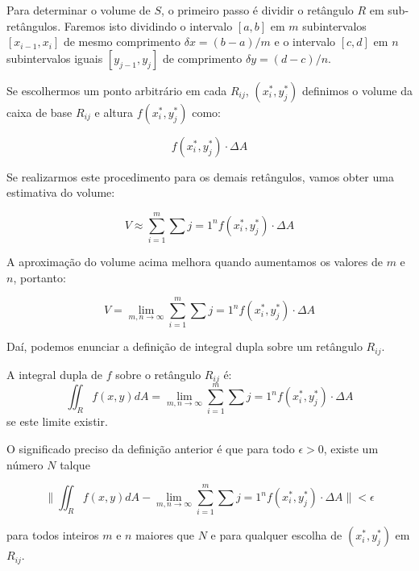 Para determinar o volume de $S$, o primeiro passo é dividir o retângulo $R$ em sub-retângulos. Faremos isto dividindo o intervalo $[a,b]$ em $m$ subintervalos $[x_{i-1}, x_{i}]$ de mesmo comprimento $\delta x = (b-a)/m$ e o intervalo $[c,d]$ em $n$ subintervalos iguais $[y_{j-1}, y_{j}]$ de comprimento $\delta y = (d-c)/n$.

\begin{figure}[!h]
 \centering
 
\end{figure}

Se escolhermos um ponto arbitrário em cada $R_{ij}$, $(x_i^*, y_j^*)$ definimos o volume da caixa de base $R_{ij}$ e altura $f(x_i^*, y_j^*)$ como:

$$ f(x_i^*, y_j^*) \cdot \Delta A $$

Se realizarmos este procedimento para os demais retângulos, vamos obter uma estimativa do volume:

$$ V \approx \sum_{i=1}^m \sum{j=1}^n f(x_i^*, y_j^*) \cdot \Delta A $$

A aproximação do volume acima melhora quando aumentamos os valores de $m$ e $n$, portanto:

$$ V = \lim_{m,n \rightarrow \infty} \sum_{i=1}^m \sum{j=1}^n f(x_i^*, y_j^*) \cdot \Delta A $$

Daí, podemos enunciar a definição de integral dupla sobre um retângulo $R_{ij}$.

\begin{definition}
 A integral dupla de $f$ sobre o retângulo $R_{ij}$ é:
 \begin{equation}
  \iint _{R} f(x,y) dA = \lim_{m,n \rightarrow \infty} \sum_{i=1}^m \sum{j=1}^n f(x_i^*, y_j^*) \cdot \Delta A
 \end{equation}
 se este limite existir.
\end{definition}

O significado preciso da definição anterior é que para todo $\epsilon > 0$, existe um número $N$ talque

$$ \| \iint _{R} f(x,y) dA -  \lim_{m,n \rightarrow \infty} \sum_{i=1}^m \sum{j=1}^n f(x_i^*, y_j^*) \cdot \Delta A \| < \epsilon $$

para todos inteiros $m$ e $n$ maiores que $N$ e para qualquer escolha de $(x_i^*, y_j^*)$ em $R_{ij}$.

